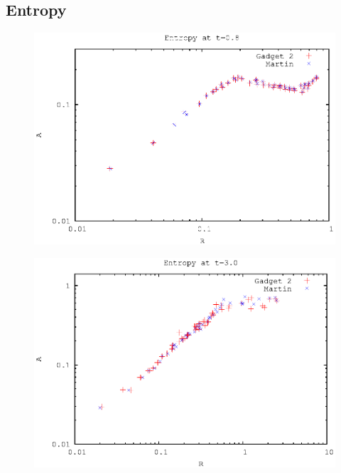 \documentclass[11pt,a4paper]{article} %
\begin{document}
\subsection*{Entropy}
\begin{figure}[H]
\centering
\includegraphics[width=\textwidth]{logA0.8.eps}
\end{figure}

\begin{figure}[H]
\centering
\includegraphics[width=\textwidth]{logA3.0.eps}
\end{figure}


\label{lastpage}
\end{document}
